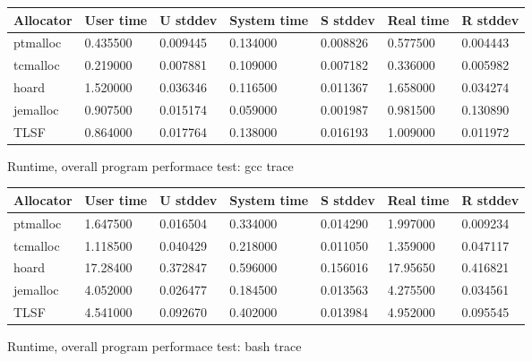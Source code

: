 \begin{figure}[h]
\begin{center}
\begin{tabular}{|l|l|l|l|l|l|l|}
\hline
Allocator & User time & U stddev & System time & S stddev & Real time & R stddev \\
\hline \hline
ptmalloc & 0.435500 & 0.009445 & 0.134000 & 0.008826 & 0.577500 & 0.004443 \\ \hline
tcmalloc & 0.219000 & 0.007881 & 0.109000 & 0.007182 & 0.336000 & 0.005982 \\ \hline
hoard    & 1.520000 & 0.036346 & 0.116500 & 0.011367 & 1.658000 & 0.034274 \\ \hline
jemalloc & 0.907500 & 0.015174 & 0.059000 & 0.001987 & 0.981500 & 0.130890 \\ \hline
TLSF     & 0.864000 & 0.017764 & 0.138000 & 0.016193 & 1.009000 & 0.011972 \\ \hline
\end{tabular}
\caption{Runtime, overall program performace test: gcc trace}
\label{overall-gcc}
\end{center}
\end{figure}

\begin{figure}[h]
\begin{center}
\begin{tabular}{|l|l|l|l|l|l|l|}
\hline
Allocator & User time & U stddev & System time & S stddev & Real time & R stddev \\
\hline \hline
ptmalloc & 1.647500  & 0.016504 & 0.334000 & 0.014290 & 1.997000 & 0.009234 \\ \hline
tcmalloc & 1.118500  & 0.040429 & 0.218000 & 0.011050 & 1.359000 & 0.047117 \\ \hline
hoard    & 17.28400  & 0.372847 & 0.596000 & 0.156016 & 17.95650 & 0.416821 \\ \hline
jemalloc & 4.052000  & 0.026477 & 0.184500 & 0.013563 & 4.275500 & 0.034561 \\ \hline
TLSF     & 4.541000  & 0.092670 & 0.402000 & 0.013984 & 4.952000 & 0.095545 \\ \hline
\end{tabular}
\caption{Runtime, overall program performace test: bash trace}
\label{overall-bash}
\end{center}
\end{figure}


